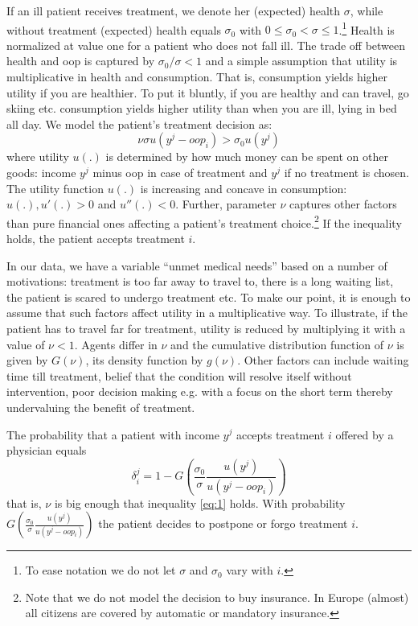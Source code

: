 \documentclass[a4paper,12pt]{article}
\begin{document}
If an ill patient receives treatment, we denote her (expected) health \(\sigma\), while without treatment (expected) health equals \(\sigma_0\) with \(0 \leq \sigma_0 < \sigma \leq 1\).\footnote{To ease notation we do not let \(\sigma\) and \(\sigma_0\) vary with \(i\).} Health is normalized at value one for a patient who does not fall ill. The trade off between health and oop is captured by \(\sigma_0/\sigma <1\) and a simple assumption that utility is multiplicative in health and consumption. That is, consumption yields higher utility if you are healthier. To put it bluntly, if you are healthy and can travel, go skiing etc. consumption yields higher utility than when you are ill, lying in bed all day. We model the patient's treatment decision as:
\begin{equation}
\label{eq:1}
\nu \sigma u(y^j-oop_i) > \sigma_0 u(y^j)
\end{equation}
where utility \(u(.)\) is determined by how much money can be spent on other goods: income \(y^j\) minus oop in case of treatment and \(y^j\) if no treatment is chosen. The utility function \(u(.)\) is increasing and concave in consumption: \(u(.), u'(.) >0\) and \(u''(.) < 0\). Further, parameter \(\nu\) captures other factors than pure financial ones affecting a patient's treatment choice.\footnote{Note that we do not model the decision to buy insurance. In Europe (almost) all citizens are covered by automatic or mandatory insurance.} If the inequality holds, the patient accepts treatment \(i\).

In our data, we have a variable ``unmet medical needs'' based on a number of motivations: treatment is too far away to travel to, there is a long waiting list, the patient is scared to undergo treatment etc. To make our point, it is enough to assume that such factors affect utility in a multiplicative way. To illustrate, if the patient has to travel far for treatment, utility is reduced by multiplying it with a value of \(\nu < 1\). Agents differ in \(\nu\) and the cumulative distribution function of \(\nu\) is given by \(G(\nu)\), its density function by \(g(\nu)\). Other factors can include waiting time till treatment, belief that the condition will resolve itself without intervention, poor decision making e.g. with a focus on the short term thereby undervaluing the benefit of treatment.

The probability that a patient with income \(y^{j}\) accepts treatment \(i\) offered by a physician equals
\begin{equation}
\label{eq:2}
\delta_i^j = 1-G\left( \frac{\sigma_0}{\sigma} \frac{u(y^{j})}{u(y^{j}-oop_i)} \right)
\end{equation}
that is, \(\nu\) is big enough that inequality \eqref{eq:1} holds. With probability \(G\left( \frac{\sigma_0}{\sigma} \frac{u(y^{j})}{u(y^{j}-oop_i)} \right)\) the patient decides to postpone or forgo treatment \(i\).
\end{document}
